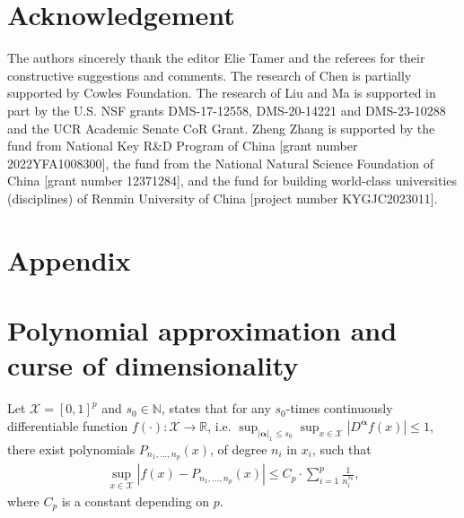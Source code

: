 \documentclass[11pt]{article}
\numberwithin{equation}{section}
\begin{document}

\section*{Acknowledgement}
The authors sincerely thank the editor Elie Tamer and the referees for their
constructive suggestions and comments. The research of Chen is partially supported by Cowles Foundation.
 The research of Liu and Ma is supported in part by the U.S. NSF grants DMS-17-12558, DMS-20-14221 and DMS-23-10288 and the UCR Academic Senate CoR Grant.  Zheng Zhang is
supported by the fund from National Key R\&D Program of China [grant number 2022YFA1008300], the fund from the National
Natural Science Foundation of China [grant number 12371284], and the fund for building world-class universities (disciplines) of Renmin University of China [project number KYGJC2023011].
\clearpage
\appendix
\section*{Appendix}
\section{Polynomial approximation and curse of dimensionality}\label{appendix:polynomial}
Let $\mathcal{X}=[0,1]^p$ and $s_0\in\mathbb{N}$, \citet[Theorem 8]{lorentz1966approximation} states that  for any $s_0$-times continuously differentiable function $f(\cdot):\mathcal{X}\to\mathbb{R}$,  i.e.
 $\sup_{|\boldsymbol{\alpha}|_1\leq s_0 }\sup_{x\in\mathcal{X}}|D^{\boldsymbol{\alpha}}f(x)|\leq 1$, there exist polynomials $P_{n_1,...,n_p}(x)$, of degree $n_i$ in $x_i$, such that
\begin{align*}
	\sup_{x\in\mathcal{X}}|f(x)-	P_{n_1,...,n_p}(x)|\leq C_p\cdot \sum_{i=1}^p \frac{1}{n_i^{s_0}},
\end{align*}
where $C_p$ is a constant depending on $p$.
\end{document}
